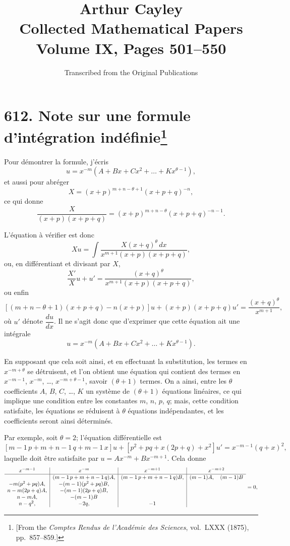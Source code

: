 \documentclass[11pt,a4paper]{article}
\title{\textbf{Arthur Cayley}\\\vspace{0.5em}
\Large Collected Mathematical Papers\\\vspace{0.3em}
\large Volume IX, Pages 501--550}
\author{Transcribed from the Original Publications}
\date{}
\theoremstyle{plain}
\theoremstyle{definition}
\theoremstyle{remark}
\begin{document}
\maketitle
\thispagestyle{empty}

\tableofcontents
\newpage

\section[Note sur une formule d'int\'{e}gration ind\'{e}finie]{\textbf{612.} Note sur une formule d'int\'{e}gration ind\'{e}finie\footnote{[From the \textit{Comptes Rendus de l'Acad\'{e}mie des Sciences}, vol.~LXXX (1875), pp.~857--859.]}}

Pour d\'{e}montrer la formule, j'\'{e}cris
\[
u = x^{-m}(A + Bx + Cx^2 + \ldots + Kx^{\theta-1}),
\]
et aussi pour abr\'{e}ger
\[
X = (x+p)^{m+n-\theta+1}(x+p+q)^{-n},
\]
ce qui donne
\[
\frac{X}{(x+p)(x+p+q)} = (x+p)^{m+n-\theta}(x+p+q)^{-n-1}.
\]

L'\'{e}quation \`{a} v\'{e}rifier est donc
\[
Xu = \int \frac{X(x+q)^\theta\,dx}{x^{m+1}(x+p)(x+p+q)},
\]
ou, en diff\'{e}rentiant et divisant par $X$,
\[
\frac{X'}{X}u + u' = \frac{(x+q)^\theta}{x^{m+1}(x+p)(x+p+q)},
\]
ou enfin
\[
[(m+n-\theta+1)(x+p+q) - n(x+p)]u + (x+p)(x+p+q)u' = \frac{(x+q)^\theta}{x^{m+1}},
\]
o\`{u} $u'$ d\'{e}note $\dfrac{du}{dx}$. Il ne s'agit donc que d'exprimer que cette \'{e}quation ait une int\'{e}grale
\[
u = x^{-m}(A + Bx + Cx^2 + \ldots + Kx^{\theta-1}).
\]

En supposant que cela soit ainsi, et en effectuant la substitution, les termes en $x^{-m+\theta}$ se d\'{e}truisent, et l'on obtient une \'{e}quation qui contient des termes en $x^{-m-1}$, $x^{-m}$, \ldots, $x^{-m+\theta-1}$, savoir $(\theta+1)$ termes. On a ainsi, entre les $\theta$ coefficients $A$, $B$, $C$, \ldots, $K$ un syst\`{e}me de $(\theta+1)$ \'{e}quations lin\'{e}aires, ce qui implique une condition entre les constantes $m$, $n$, $p$, $q$; mais, cette condition satisfaite, les \'{e}quations se r\'{e}duisent \`{a} $\theta$ \'{e}quations ind\'{e}pendantes, et les coefficients seront ainsi d\'{e}termin\'{e}s.

Par exemple, soit $\theta = 2$; l'\'{e}quation diff\'{e}rentielle est
\[
[m-1\,p + m+n-1\,q + m-1\,x]u + [p^2 + pq + x(2p+q) + x^2]u' = x^{-m-1}(q+x)^2,
\]
laquelle doit \^{e}tre satisfaite par $u = Ax^{-m} + Bx^{-m+1}$. Cela donne
\[
\begin{array}{c|c|c|c}
x^{-m-1} & x^{-m} & x^{-m+1} & x^{-m+2}\\
\hline
& (m-1\,p+m+n-1\,q)A, & (m-1\,p+m+n-1\,q)B, & (m-1)A,\quad (m-1)B\\
-m(p^2+pq)A, & -(m-1)(p^2+pq)B, & \\n-m(2p+q)A, & -(m-1)(2p+q)B, & \\n-mA, & -(m-1)B & \\n-q^2, & -2q, & -1
\end{array} = 0,
\]
\end{document}

